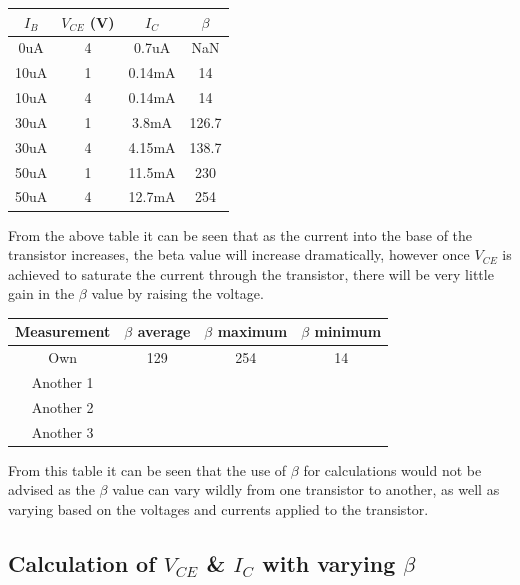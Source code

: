 \documentclass[a4paper,11pt]{article}
\begin{document}
\begin{center}
\begin{tabular}{|c|c|c|c|}  
\hline
 $ I_B$  & $V_{CE}$ (V) & $I_C$ & $\beta$\\
\hline
0uA & 4 & 0.7uA & NaN\\
10uA & 1 & 0.14mA & 14\\
10uA & 4 & 0.14mA & 14\\
30uA & 1 & 3.8mA & 126.7\\
30uA & 4 & 4.15mA & 138.7\\
50uA & 1 & 11.5mA & 230\\
50uA & 4 & 12.7mA & 254\\
\hline
\end{tabular}
\end{center}

From the above table it can be seen that as the current into the base of the transistor increases, the beta value will increase dramatically, however once $V_{CE}$ is achieved to saturate the current through the transistor, there will be very little gain in the $\beta$ value by raising the voltage.

\begin{center}
\begin{tabular}{|c|c|c|c|}  
\hline
Measurement & $\beta$ average & $\beta$ maximum & $\beta$ minimum\\
\hline
Own & 129 & 254 & 14\\
\hline
Another 1 & & & \\
\hline
Another 2 & & & \\
\hline
Another 3 & & & \\
\hline
\end{tabular}
\end{center}

From this table it can be seen that the use of $\beta$ for calculations would not be advised as the $\beta$ value can vary wildly from one transistor to another, as well as  varying based on the voltages and currents applied to the transistor.

\pagebreak
\subsection{Calculation of $V_{CE}$ \& $I_C$ with varying $\beta$ }
\end{document}

